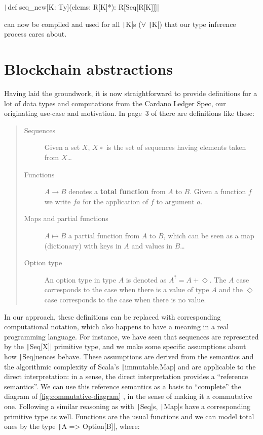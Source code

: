 \documentclass[11pt]{article}
\renewcommand{\vref}[1]{\autoref{#1} \vpageref{#1}}{}
\newcommand{\ScalaI}[1]{\texttt|#1|}
\begin{document}
\ScalaI{def seq_new[K: Ty](elems: R[K]*): R[Seq[R[K]]]}

\noindent can now be compiled and used for all \ScalaI{K}s ($\forall$ \ScalaI{K}) that our type inference process cares about.

\section{Blockchain abstractions}
\label{sec:chain}
Having laid the groundwork, it is now straightforward to provide definitions for a lot of data types and computations from the Cardano Ledger Spec, our originating use-case and motivation. In page~3 of \cite{cardano:ledger-spec:shelley:2019} there are definitions like these:

\begin{quote}
\begin{description}
  \item[Sequences]
  Given a set $X$, $X∗$ is the set of sequences having elements taken from $X$\dots
  
  \item[Functions]
  $A \to B$ denotes a \textbf{total function} from $A$ to $B$. Given a function $f$ we write $f a$ for the application of $f$ to argument $a$.
  
  \item[Maps and partial functions]
  $A \mapsto B$ a partial function from $A$ to $B$, which can be seen as a map (dictionary) with keys in $A$ and values in $B$\dots
  
  \item[Option type]
  An option type in type $A$ is denoted as $A^? = A + \Diamond$. The $A$ case corresponds to
the case when there is a value of type $A$ and the $\Diamond$ case corresponds to the case when there is no value.
\end{description}
\end{quote}

In our approach, these definitions can be replaced with corresponding computational notation, which also happens to have a meaning in a real programming language. For instance, we have seen that sequences are represented by the \ScalaI{Seq[X]} primitive type, and we make some specific assumptions about how \ScalaI{Seq}uences behave. These assumptions are derived from the semantics and the algorithmic complexity of Scala's \ScalaI{immutable.Map} and are applicable to the direct interpretation: in a sense, the direct interpretation provides a ``reference semantics''. We can use this reference semantics as a basis to ``complete'' the diagram of \vref{fig:commutative-diagram}, in the sense of making it a commutative one. Following a similar reasoning as with \ScalaI{Seq}s, \ScalaI{Map}s have a corresponding primitive type as well. Functions are the usual functions and we can model total ones by the type \ScalaI{A => Option[B]}, where:
\end{document}
